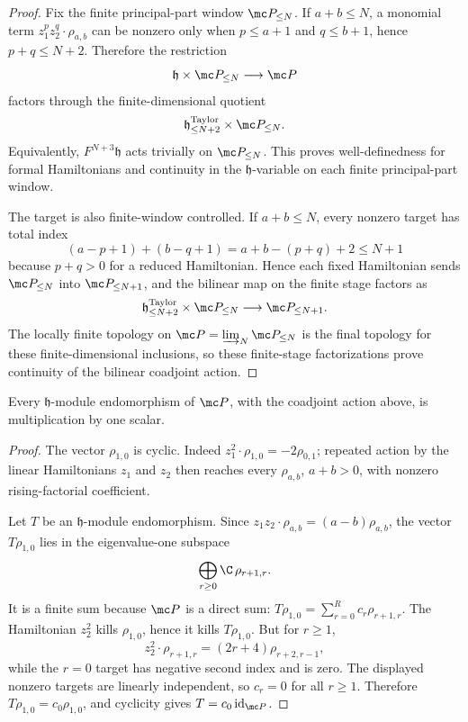 \begin{proof}
  Fix the finite principal-part window \(\mc P_{\leq N}\).  If
  \(a+b\leq N\), a monomial term
  \(z_1^p z_2^q\cdot\rho_{a,b}\) can be nonzero only when
  \(p\leq a+1\) and \(q\leq b+1\), hence \(p+q\leq N+2\).  Therefore the
  restriction
  \[
    \mathfrak h\times\mc P_{\leq N}\longrightarrow \mc P
  \]
  factors through the finite-dimensional quotient
  \[
    \mathfrak h^{\mathrm{Taylor}}_{\leq N+2}\times \mc P_{\leq N}.
  \]
  Equivalently, \(F^{N+3}\mathfrak h\) acts trivially on
  \(\mc P_{\leq N}\).  This proves well-definedness for formal
  Hamiltonians and continuity in the \(\mathfrak h\)-variable on each
  finite principal-part window.

  The target is also finite-window controlled.  If \(a+b\leq N\), every
  nonzero target has total index
  \[
    (a-p+1)+(b-q+1)=a+b-(p+q)+2\leq N+1
  \]
  because \(p+q>0\) for a reduced Hamiltonian.  Hence each fixed
  Hamiltonian sends \(\mc P_{\leq N}\) into \(\mc P_{\leq N+1}\), and the
  bilinear map on the finite stage factors as
  \[
    \mathfrak h^{\mathrm{Taylor}}_{\leq N+2}\times\mc P_{\leq N}
      \longrightarrow \mc P_{\leq N+1}.
  \]
  The locally finite topology on \(\mc P=\varinjlim_N\mc P_{\leq N}\) is
  the final topology for these finite-dimensional inclusions, so these
  finite-stage factorizations prove continuity of the bilinear coadjoint
  action.
\end{proof}

\begin{lem}
\label{lem:app-matlis-coadjoint-centralizer}
  Every \(\mathfrak h\)-module endomorphism of \(\mc P\), with the
  coadjoint action above, is multiplication by one scalar.
\end{lem}

\begin{proof}
  The vector \(\rho_{1,0}\) is cyclic.  Indeed
  \(z_1^2\cdot\rho_{1,0}=-2\rho_{0,1}\); repeated action by the linear
  Hamiltonians \(z_1\) and \(z_2\) then reaches every
  \(\rho_{a,b}\), \(a+b>0\), with nonzero rising-factorial coefficient.

  Let \(T\) be an \(\mathfrak h\)-module endomorphism.  Since
  \(z_1z_2\cdot\rho_{a,b}=(a-b)\rho_{a,b}\), the vector
  \(T\rho_{1,0}\) lies in the eigenvalue-one subspace
  \[
    \bigoplus_{r\geq0}\C\,\rho_{r+1,r}.
  \]
  It is a finite sum because \(\mc P\) is a direct sum:
  \(T\rho_{1,0}=\sum_{r=0}^R c_r\rho_{r+1,r}\).  The Hamiltonian
  \(z_2^2\) kills \(\rho_{1,0}\), hence it kills \(T\rho_{1,0}\).  But
  for \(r\geq1\),
  \[
    z_2^2\cdot\rho_{r+1,r}
      =(2r+4)\rho_{r+2,r-1},
  \]
  while the \(r=0\) target has negative second index and is zero.  The
  displayed nonzero targets are linearly independent, so \(c_r=0\) for
  all \(r\geq1\).  Therefore \(T\rho_{1,0}=c_0\rho_{1,0}\), and cyclicity
  gives \(T=c_0\,\mathrm{id}_{\mc P}\).
\end{proof}

